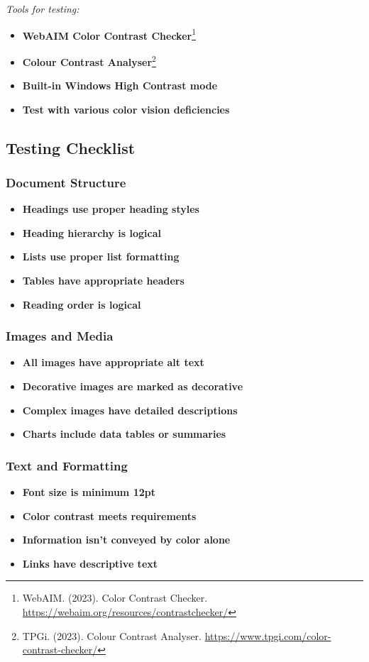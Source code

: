 \emph{Tools for testing:}
\begin{itemize}
\item \textbf{WebAIM Color Contrast Checker}\footnote{WebAIM. (2023). Color Contrast Checker. \url{https://webaim.org/resources/contrastchecker/}}
\item \textbf{Colour Contrast Analyser}\footnote{TPGi. (2023). Colour Contrast Analyser. \url{https://www.tpgi.com/color-contrast-checker/}}
\item \textbf{Built-in Windows High Contrast mode}
\item \textbf{Test with various color vision deficiencies}
\end{itemize}

\subsection{Testing Checklist}

\subsubsection{Document Structure}
\begin{itemize}
\item[\checkmark] \textbf{Headings use proper heading styles}
\item[\checkmark] \textbf{Heading hierarchy is logical}
\item[\checkmark] \textbf{Lists use proper list formatting}
\item[\checkmark] \textbf{Tables have appropriate headers}
\item[\checkmark] \textbf{Reading order is logical}
\end{itemize}

\subsubsection{Images and Media}
\begin{itemize}
\item[\checkmark] \textbf{All images have appropriate alt text}
\item[\checkmark] \textbf{Decorative images are marked as decorative}
\item[\checkmark] \textbf{Complex images have detailed descriptions}
\item[\checkmark] \textbf{Charts include data tables or summaries}
\end{itemize}

\subsubsection{Text and Formatting}
\begin{itemize}
\item[\checkmark] \textbf{Font size is minimum 12pt}
\item[\checkmark] \textbf{Color contrast meets requirements}
\item[\checkmark] \textbf{Information isn't conveyed by color alone}
\item[\checkmark] \textbf{Links have descriptive text}
\end{itemize}

